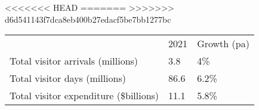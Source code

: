 <<<<<<< HEAD
=======
>>>>>>> d6d541143f7dca8eb400b27edacf5be7bb1277bc
\begin{tabular}[t]{p{4.7cm}>{\hfill}p{1.1cm}>{\hfill}p{1.7cm}}
   & 2021 & Growth (pa) \\ 
 Total visitor arrivals (millions) & 3.8 & 4\% \\ 
  Total visitor days (millions) & 86.6 & 6.2\% \\ 
  Total visitor expenditure (\$billions) & 11.1 & 5.8\% \\ 
  \end{tabular}
